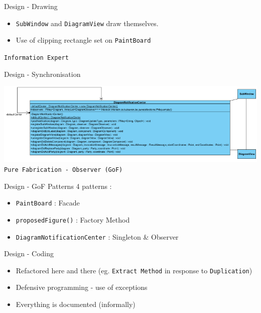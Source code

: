 \documentclass[10pt]{beamer}
\begin{document}
\begin{frame}[fragile]{Design - Drawing}
\begin{itemize}
\item \texttt{SubWindow} and \texttt{DiagramView} draw themselves.
\item Use of clipping rectangle set on \texttt{PaintBoard}
\end{itemize}
\begin{center}
\vspace{1cm}
\texttt{Information Expert}
\end{center}
\end{frame}

\begin{frame}[fragile]{Design - Synchronisation}
\begin{center}
\includegraphics[width=1\textwidth]{notificationcenter}\\
\texttt{Pure Fabrication - Observer (GoF)}
\end{center}
\end{frame}

\begin{frame}[fragile]{Design - GoF Patterns}
4 patterns :
\begin{itemize}
\item \texttt{PaintBoard} : Facade
\item \texttt{proposedFigure()} : Factory Method
\item \texttt{DiagramNotificationCenter} : Singleton \& Observer
\end{itemize}
\end{frame}

\begin{frame}[fragile]{Design - Coding}
\begin{itemize}
\item Refactored here and there (eg. \texttt{Extract Method} in response to \texttt{Duplication})
\item Defensive programming - use of exceptions
\item Everything is documented (informally)
\end{itemize}
\end{frame}
\end{document}
